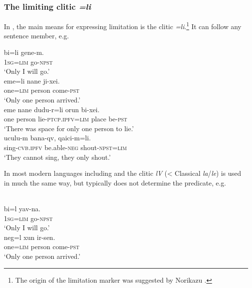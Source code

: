 \documentclass[output=paper,colorlinks,citecolor=brown]{langscibook}
\begin{document}
\subsubsection{The limiting clitic \textit{=li}\label{Section9.3.3.5}}

In , the main means for expressing limitation is the clitic \textit{=li}.\footnote{The  origin of the  limitation marker was suggested by Norikazu \citet{Kogura2020}.} It can follow any sentence member, e.g.

\ea
    \label{example9.33}
    \gll bi=li 		gene-m.\\
    1\textsc{sg}=\textsc{lim} 	go-\textsc{npst}\\
    \glt `Only I will go.'\\
\ex
    \label{example9.34}
    \gll eme=li 	nane 	ji-xei.\\
    one=\textsc{lim} 	person come-\textsc{pst}\\
    \glt `Only one person arrived.'\\
\ex
    \label{example9.35}
    \gll eme 	nane 	dudu-r=li 		orun 	bi-xei.\\
    one 	person 	lie-\textsc{ptcp.ipfv=lim} 	place 	be-\textsc{pst}\\
    \glt `There was space for only one person to lie.'\\
\ex
    \label{example9.36}
    \gll uculu-m 		bana-qv, 	qaici-m=li.\\
    sing-\textsc{cvb.ipfv} 	be.able-\textsc{neg} 	shout-\textsc{npst=lim}\\
    \glt `They cannot sing, they only shout.'\\
    \z

In most modern  languages including  and  the clitic \textit{lV} (<  Classical  \textit{la}/\textit{le}) is used in much the same way, but typically does not determine the predicate, e.g. 

\ea
    \label{example9.37}
    \\
    \gll bi=l 		yav-na.\\
    1\textsc{sg=lim} 	go-\textsc{npst}\\
    \glt `Only I will go.'\\
\ex
    \label{example9.38}
    \gll neg=l 		xun	 ir-sen.\\
    one=\textsc{lim} 	person 	 come-\textsc{pst}\\
    \glt `Only one person arrived.'\\
    \z
\end{document}
